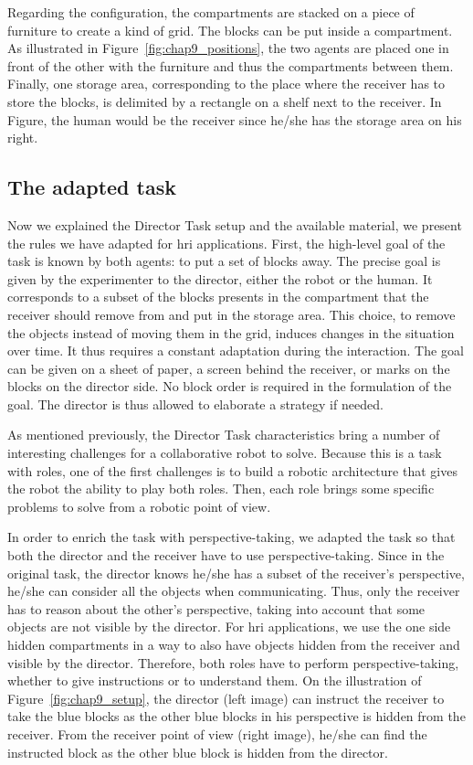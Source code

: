 Regarding the configuration, the compartments are stacked on a piece of furniture to create a kind of grid. The blocks can be put inside a compartment. As illustrated in Figure~\ref{fig:chap9_positions}, the two agents are placed one in front of the other with the furniture and thus the compartments between them. Finally, one storage area, corresponding to the place where the receiver has to store the blocks, is delimited by a rectangle on a shelf next to the receiver. In Figure, the human would be the receiver since he/she has the storage area on his right.

\subsection{The adapted task}

Now we explained the Director Task setup and the available material, we present the rules we have adapted for \acrshort{hri} applications. First, the high-level goal of the task is known by both agents: to put a set of blocks away. The precise goal is given by the experimenter to the director, either the robot or the human. It corresponds to a subset of the blocks presents in the compartment that the receiver should remove from and put in the storage area. This choice, to remove the objects instead of moving them in the grid, induces changes in the situation over time. It thus requires a constant adaptation during the interaction. The goal can be given on a sheet of paper, a screen behind the receiver, or marks on the blocks on the director side. No block order is required in the formulation of the goal. The director is thus allowed to elaborate a strategy if needed.

As mentioned previously, the Director Task characteristics bring a number of interesting challenges for a collaborative robot to solve. Because this is a task with roles, one of the first challenges is to build a robotic architecture that gives the robot the ability to play both roles. Then, each role brings some specific problems to solve from a robotic point of view.

In order to enrich the task with perspective-taking, we adapted the task so that both the director and the receiver have to use perspective-taking. Since in the original task, the director knows he/she has a subset of the receiver's perspective, he/she can consider all the objects when communicating. Thus, only the receiver has to reason about the other's perspective, taking into account that some objects are not visible by the director. For \acrshort{hri} applications, we use the one side hidden compartments in a way to also have objects hidden from the receiver and visible by the director. Therefore, both roles have to perform perspective-taking, whether to give instructions or to understand them. On the illustration of Figure~\ref{fig:chap9_setup}, the director (left image) can instruct the receiver to take the blue blocks as the other blue blocks in his perspective is hidden from the receiver. From the receiver point of view (right image), he/she can find the instructed block as the other blue block is hidden from the director.

